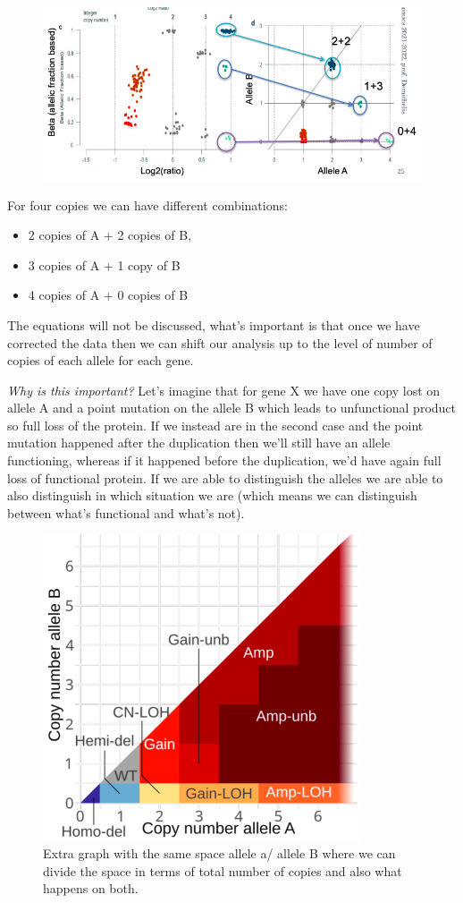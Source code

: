 \begin{figure}[H]
\centering
\includegraphics[width=0.5\linewidth]{image12.png}
\caption{}
\label{fig:img12}
\end{figure}

For four copies we can have different combinations:
\begin{itemize}
\item
  2 copies of A + 2 copies of B,
\item
  3 copies of A + 1 copy of B
\item
  4 copies of A + 0 copies of B
\end{itemize}

The equations will not be discussed, what's important is that once we have corrected the data then we can shift our analysis up to the level of number of copies of each allele for each gene.

\emph{Why is this important?}
Let's imagine that for gene X we have one copy lost on allele A and a point mutation on the allele B which leads to unfunctional product so full loss of the protein.
If we instead are in the second case and the point mutation happened after the duplication then we'll still have an allele functioning, whereas if it happened before the duplication, we'd have again full loss of functional protein.
If we are able to distinguish the alleles we are able to also distinguish in which situation we are (which means we can distinguish between what's functional and what's not).

\begin{figure}[H]
\centering
\includegraphics[width=0.3\linewidth]{image13.png}
\caption{Extra graph with the same space allele a/ allele B where we can divide the space in terms of total number of copies and also what happens on both.}
\label{fig:img13}
\end{figure}

